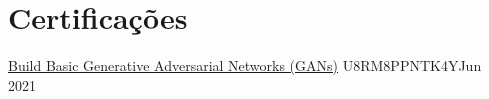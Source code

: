 \section{Certificações}
\resumeSubHeadingListStart

\resumePubliSubheading
{\href{https://www.coursera.org/account/accomplishments/verify/U8RM8PPNTK4Y}{Build Basic Generative Adversarial Networks (GANs)}}
{U8RM8PPNTK4Y}{Jun 2021}

\resumeSubHeadingListEnd